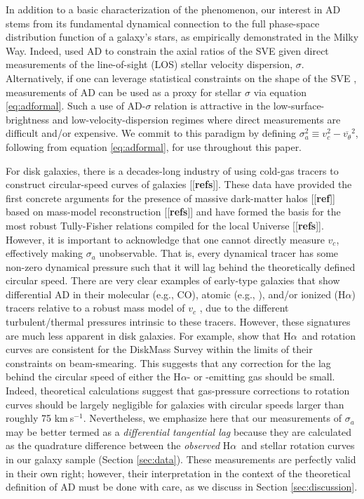 \documentclass[apj,iop,revtex4,numberedappendix]{emulateapj}
\newcommand{\comment}[2][todo]{{\color{#1}[[{\bf #2}]]}}
\newcommand{\kms}{{km$~\!$s$^{-1}$}}
\newcommand{\halpha}{H$\alpha$}
\begin{document}
In addition to a basic characterization of the phenomenon, our interest
in AD stems from its fundamental dynamical connection to the full
phase-space distribution function of a galaxy's stars, as empirically
demonstrated in the Milky Way.  Indeed, \citet{2011ApJ...742...18W} used
AD to constrain the axial ratios of the SVE given direct measurements of
the line-of-sight (LOS) stellar velocity dispersion, $\sigma$.
Alternatively, if one can leverage statistical constraints on the shape
of the SVE \citep[e.g.][]{2012MNRAS.423.2726G}, measurements of AD can
be used as a proxy for stellar $\sigma$ via equation \ref{eq:adformal}.
Such a use of AD-$\sigma$ relation is attractive in the
low-surface-brightness and low-velocity-dispersion regimes where direct
measurements are difficult and/or expensive.  We commit to this paradigm
by defining $\sigma_a^2 \equiv v_c^2 - \overline{v_\theta}^2$, following
from equation \ref{eq:adformal}, for use throughout this paper.

For disk galaxies, there is a decades-long industry of using cold-gas
tracers to construct circular-speed curves of galaxies \comment{refs}.
These data have provided the first concrete arguments for the presence
of massive dark-matter halos \comment{ref} based on mass-model
reconstruction \comment{refs} and have formed the basis for the most
robust Tully-Fisher relations compiled for the local Universe
\comment{refs}.  However, it is important to acknowledge that one cannot
directly measure $v_c$, effectively making $\sigma_a$ unobservable.
That is, every dynamical tracer has some non-zero dynamical pressure
such that it will lag behind the theoretically defined circular speed.
There are very clear examples of early-type galaxies that show
differential AD in their molecular (e.g., CO), atomic (e.g.,
), and/or ionized (\halpha) tracers relative to a robust mass
model of $v_c$ \citep{2013MNRAS.429..534D}, due to the different
turbulent/thermal pressures intrinsic to these tracers.  However, these
signatures are much less apparent in disk galaxies.  For example,
\citet{2013A&A...557A.131M} show that \halpha\ and  rotation
curves are consistent for the DiskMass Survey within the limits of their
constraints on beam-smearing.  This suggests that any correction for the
lag behind the circular speed of either the \halpha- or
-emitting gas should be small.  Indeed, theoretical
calculations \citet{2010ApJ...721..547D} suggest that gas-pressure
corrections to  rotation curves should be largely negligible
for galaxies with circular speeds larger than roughly 75 \kms.
Nevertheless, we emphasize here that our measurements of $\sigma_a$ may
be better termed as a {\em differential tangential lag} because they are
calculated as the quadrature difference between the {\em observed}
\halpha\ and stellar rotation curves in our galaxy sample (Section
\ref{sec:data}).  These measurements are perfectly valid in their own
right; however, their interpretation in the context of the theoretical
definition of AD must be done with care, as we discuss in Section
\ref{sec:discussion}.
\end{document}
